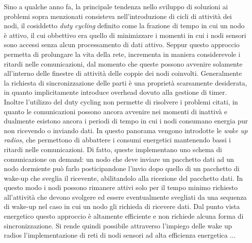 \documentclass[binding=0.6cm,TFA]{sapthesis}
\begin{document}
Sino a qualche anno fa, la principale tendenza nello sviluppo di soluzioni ai problemi sopra menzionati consisteva nell'introduzione di cicli di attività
dei nodi, il cosiddetto \emph{duty cycling} definito come la frazione di tempo in cui un nodo è attivo, il cui obbettivo era quello di minimizzare i momenti
in cui i nodi sensori sono accessi senza alcun processamento di dati attivo. Seppur questo approccio permetta di prolungare la vita della rete,
incrementa in maniera considerevole i ritardi nelle comunicazioni, dal momento che queste possono avvenire solamente all'interno delle finestre di attività
delle coppie dei nodi coinvolti. Generalmente la richiesta di sincronizzazione delle parti è una proprietà scarsamente desiderata, in quanto implicitamente
introduce overhead dovuto alla gestione di timer. Inoltre l'utilizzo del duty cycling non permette di risolvere i problemi citati, in quanto le comunicazioni
possono ancora avvenire nei momenti di inattivà e dualmente esistono ancora i periodi di tempo in cui i nodi consumano energia pur non ricevendo o inviando dati.
In questo panorama vengono introdotte le \emph{wake up radios}, che permettono di abbattere i consumi energetici mantenendo bassi i ritardi nelle comunicazioni.
Di fatto, queste implementano uno schema di comunicazione on demand: un nodo che deve inviare un pacchetto dati ad un nodo dormiente può farlo posticipandone
l'invio dopo quello di un pacchetto di wake-up che sveglia il ricevente, abilitandolo alla ricezione del pacchetto dati. In questo modo i nodi possono
rimanere attivi solo per il tempo minimo richiesto all'attività che devono svolgere ed essere eventualmente svegliati da una sequenza di wake-up nel caso
in cui un nodo gli richieda di ricevere dati. Dal punto vista energetico questo approccio è altamente efficiente e non richiede alcuna forma di
sincronizzazione. Si rende quindi possibile attraverso l'impiego delle wake up radios l'implementazione di reti di nodi sensori ad alta efficienza energetica ...

\backmatter
\cleardoublepage
{} %
\end{document}
